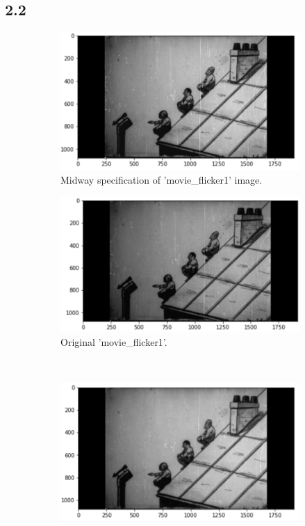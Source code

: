 \subsection*{2.2}
\begin{figure}[H]
	\centering
	\begin{subfigure}[b]{0.45\textwidth}
		\centering
		\includegraphics[width=\textwidth]{Materials/ms1}
		\caption{Midway specification of 'movie\_flicker1' image.}
	\end{subfigure}
	\hfill
	\begin{subfigure}[b]{0.45\textwidth}
		\centering
		\includegraphics[width=\textwidth]{Materials/Flicker1}
		\caption{Original 'movie\_flicker1'.}
	\end{subfigure}
	\hfill
	\\
	\begin{subfigure}[b]{0.45\textwidth}
		\centering
		\includegraphics[width=\textwidth]{Materials/ms2}

\end{subfigure}
\end{figure}

